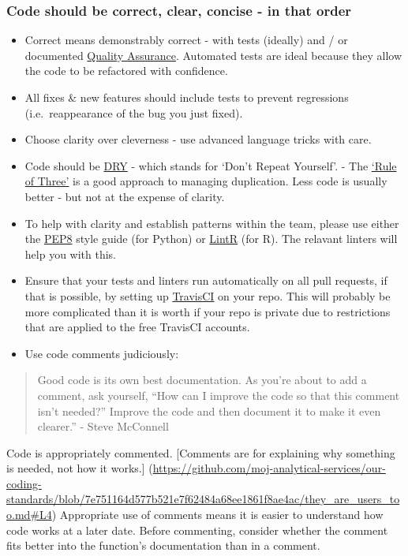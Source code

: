 \documentclass[]{book}
\providecommand{\tightlist}{%
  \setlength{\itemsep}{0pt}\setlength{\parskip}{0pt}}
\begin{document}
\hypertarget{ccc}{%
\subsubsection{Code should be correct, clear, concise - in that order}\label{ccc}}

\begin{itemize}
\tightlist
\item
  Correct means demonstrably correct - with tests (ideally) and / or documented \href{quality_assurance.md}{Quality Assurance}. Automated tests are ideal because they allow the code to be refactored with confidence.
\item
  All fixes \& new features should include tests to prevent regressions (i.e.~reappearance of the bug you just fixed).
\item
  Choose clarity over cleverness - use advanced language tricks with care.
\item
  Code should be \href{https://en.wikipedia.org/wiki/Don\%27t_repeat_yourself}{DRY} - which stands for `Don't Repeat Yourself'. - The \href{https://en.wikipedia.org/wiki/Rule_of_three_(computer_programming)}{`Rule of Three'} is a good approach to managing duplication. Less code is usually better - but not at the expense of clarity.\\
\item
  To help with clarity and establish patterns within the team, please use either the \href{https://pypi.python.org/pypi/pep8}{PEP8} style guide (for Python) or \href{https://github.com/jimhester/lintr}{LintR} (for R). The relavant linters will help you with this.
\item
  Ensure that your tests and linters run automatically on all pull requests, if that is possible, by setting up \href{https://travis-ci.org/}{TravisCI} on your repo. This will probably be more complicated than it is worth if your repo is private due to restrictions that are applied to the free TravisCI accounts.
\item
  Use code comments judiciously:
\end{itemize}

\begin{quote}
Good code is its own best documentation. As you're about to add a comment, ask yourself, ``How can I improve the code so that this comment isn't needed?'' Improve the code and then document it to make it even clearer.'' - Steve McConnell
\end{quote}

Code is appropriately commented.
{[}Comments are for explaining why something is needed, not how it works.{]} (\url{https://github.com/moj-analytical-services/our-coding-standards/blob/7e751164d577b521e7f62484a68ee1861f8ae4ac/they_are_users_too.md\#L4})
Appropriate use of comments means it is easier to understand how code works at a later date. Before commenting, consider whether the comment fits better into the function's documentation than in a comment.
\end{document}
